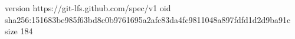 version https://git-lfs.github.com/spec/v1
oid sha256:151683be985f63bd8c0b9761695a2afc83da4fc9811048a897fdfd1d2d9ba91c
size 184
